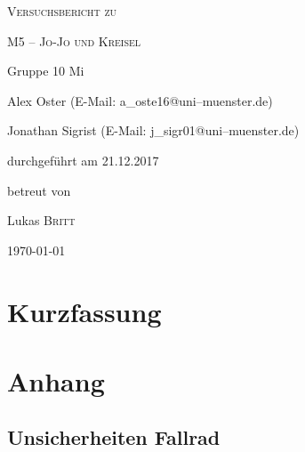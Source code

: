 \documentclass[11pt,a4paper,titlepage, ngerman]{article}
\begin{document}
	\begin{titlepage}
		\centering
		{\scshape\LARGE Versuchsbericht zu \par}
		\vspace{1cm}
		{\scshape\huge M5 -- Jo-Jo und Kreisel\par}
		\vspace{2.5cm}
		{\LARGE Gruppe 10 Mi\par}
		\vspace{0.5cm}
		{\large Alex Oster (E-Mail: a\_oste16@uni--muenster.de) \par}
		{\large Jonathan Sigrist (E-Mail: j\_sigr01@uni--muenster.de) \par}
		\vfill
		durchgeführt am 21.12.2017\par
		betreut von\par
		{\large Lukas \textsc{Britt}} 
		\vfill	
		{\large \today\par}
	\end{titlepage}
	
	\tableofcontents
	
	\newpage
	
	\section{Kurzfassung}
	
			
	\vspace{2cm} 
	
	 
	\newpage
	 
	
	
	\newpage
	
	\section{Anhang} 
		
	
	\subsection{Unsicherheiten Fallrad}
	
\end{document}
